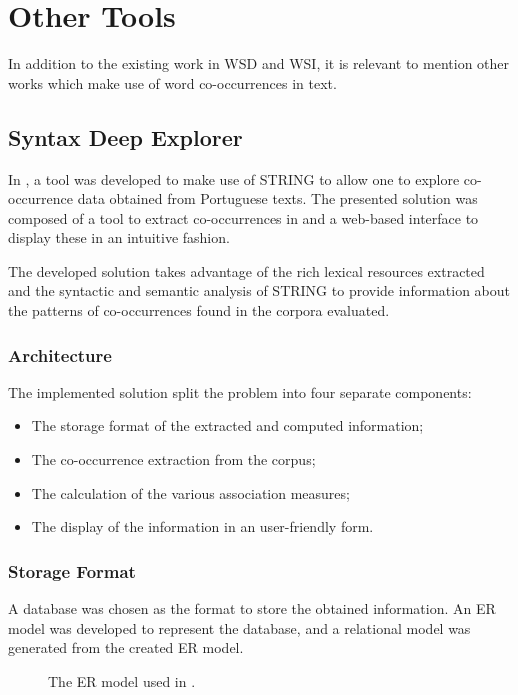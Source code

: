 \section{Other Tools}

In addition to the existing work in \ac{WSD} and \ac{WSI}, it is relevant to
mention other works which make use of word co-occurrences in text.

\subsection{Syntax Deep Explorer}

In \cite{correia2015syntax}, a tool was developed to make use of \ac{STRING} to
allow one to explore co-occurrence data obtained from Portuguese texts. The
presented solution was composed of a tool to extract co-occurrences in and a
web-based interface to display these in an intuitive fashion.

The developed solution takes advantage of the rich lexical resources extracted
and the syntactic and semantic analysis of \ac{STRING} to provide information
about the patterns of co-occurrences found in the corpora evaluated.

\subsubsection{Architecture}

The implemented solution split the problem into four separate components:

\begin{itemize}
 \item The storage format of the extracted and computed information;
 \item The co-occurrence extraction from the corpus;
 \item The calculation of the various association measures;
 \item The display of the information in an user-friendly form.
\end{itemize}

\subsubsection{Storage Format}

A database was chosen as the format to store the obtained information. An
\ac{ER} model was developed to represent the database, and a relational model
was generated from the created \ac{ER} model.

\begin{figure}
 \centering
 
 \caption[ER model of (Correia et al. 2015)]{The \ac{ER} model used in
 \cite{correia2015syntax}.}
 \label{fig:correira2015er}
\end{figure}


